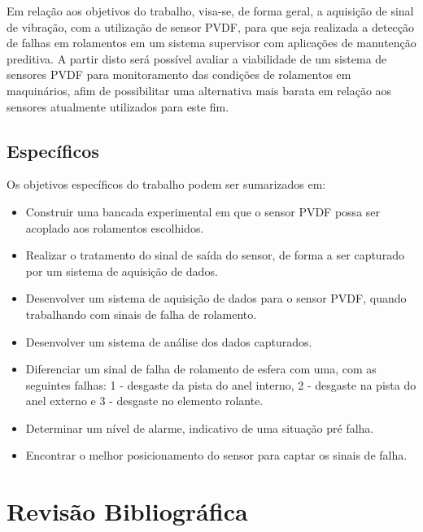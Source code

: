 \documentclass[
	12pt,				
	oneside,			
	a4paper,			
	english,			
	brazil				
	]{abntex2ppgsi}
\begin{document}
Em relação aos objetivos do trabalho, visa-se, de forma geral, a aquisição de sinal de vibração, com a utilização de sensor PVDF, para que seja realizada a detecção de falhas em rolamentos em um sistema supervisor com aplicações de manutenção preditiva. A partir disto será possível avaliar a viabilidade de um sistema de sensores PVDF para monitoramento das condições de rolamentos em maquinários, afim de possibilitar uma alternativa mais barata em relação aos sensores atualmente utilizados para este fim.

\section{\textbf {Específicos}}

Os objetivos específicos do trabalho podem ser sumarizados em:

\begin{itemize}
	\item Construir uma bancada experimental em que o sensor PVDF possa ser acoplado aos rolamentos escolhidos.
	\item Realizar o tratamento do sinal de saída do sensor, de forma a ser capturado por um sistema de aquisição de dados.
	\item Desenvolver um sistema de aquisição de dados para o sensor PVDF, quando trabalhando com sinais de falha de rolamento.
	\item Desenvolver um sistema de análise dos dados capturados.
	\item Diferenciar um sinal de falha de rolamento de esfera com uma, com as seguintes falhas: 1 - desgaste da pista do anel interno, 2 - desgaste na pista do anel externo e 3 - desgaste no elemento rolante.
	\item Determinar um nível de alarme, indicativo de uma situação pré falha.
	\item Encontrar o melhor posicionamento do sensor para captar os sinais de falha.
\end{itemize}

\chapter{Revisão Bibliográfica}
\end{document}
